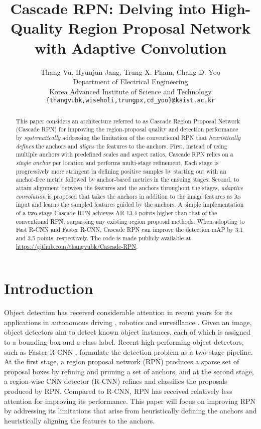 \documentclass{article}
\title{Cascade RPN: Delving into High-Quality Region Proposal Network with Adaptive Convolution}
\author{Thang Vu, \quad Hyunjun Jang, \quad Trung X. Pham, \quad Chang D. Yoo \\
	Department of Electrical Engineering\\
	Korea Advanced Institute of Science and Technology\\
	\texttt{\{thangvubk,wiseholi,trungpx,cd\_yoo\}@kaist.ac.kr} \\
}
\begin{document}
	
	\maketitle
	
	\begin{abstract}
		This paper considers an architecture referred to as Cascade Region Proposal Network (Cascade RPN) for improving the region-proposal quality and detection performance by \textit{systematically} addressing the limitation of the conventional RPN that \textit{heuristically defines} the anchors and \textit{aligns} the features to the anchors. First, instead of using multiple anchors with predefined scales and aspect ratios, Cascade RPN relies on a \textit{single anchor} per location and performs multi-stage refinement. Each stage is progressively more stringent in defining positive samples by starting out with an anchor-free metric followed by anchor-based metrics in the ensuing stages. Second, to attain alignment between the features and the anchors throughout the stages, \textit{adaptive convolution} is proposed that takes the anchors in addition to the image features as its input and learns the sampled features guided by the anchors. A simple implementation of a two-stage Cascade RPN achieves AR  13.4 points higher than that of the conventional RPN, surpassing any existing region proposal methods. When adopting to Fast R-CNN and Faster R-CNN, Cascade RPN can improve the detection mAP by 3.1 and 3.5 points, respectively.  The code is made publicly available at \url{https://github.com/thangvubk/Cascade-RPN}.
	\end{abstract}
	
	\section{Introduction}
	Object detection has received considerable attention in recent years for its applications in autonomous driving \citep{furgale2013toward,hane2015obstacle}, robotics \citep{astua2014object,danielczuk2018segmenting} and surveillance \citep{conte2005meeting,liao2017security}. Given an image, object detectors aim to detect known object instances, each of which is assigned to a bounding box and a class label. Recent high-performing object detectors, such as Faster R-CNN \citep{NIPS2015_5638}, formulate the detection problem as a two-stage pipeline. At the first stage, a region proposal network (RPN) produces a sparse set of proposal boxes by refining and pruning a set of anchors, and at the second stage, a region-wise CNN detector (R-CNN) refines and classifies the proposals produced by RPN. Compared to R-CNN, RPN has received relatively less attention for improving its performance. This paper will focus on improving RPN by addressing its limitations that arise from heuristically defining the anchors and heuristically aligning the features to the anchors.
	
\end{document}
